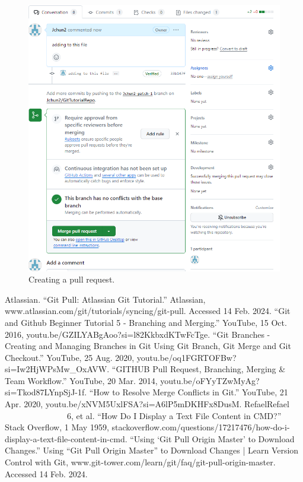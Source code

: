 \documentclass[10pt,twocolumn]{article}
\begin{document}
\begin{figure}
    \centering
    \includegraphics[width=.95\linewidth]{pullrequest.png}
    \caption{
        Creating a pull request.  
    }
    \label{Figure 11}
\end{figure}
\newpage
\newpage
\begin{thebibliography}{100}
\addtolength{\leftmargin}{0.2in} %
\setlength{\itemindent}{-0.2in}

{Atlassian. “Git Pull: Atlassian Git Tutorial.” Atlassian, www.atlassian.com/git/tutorials/syncing/git-pull. Accessed 14 Feb. 2024. }
“Git and Github Beginner Tutorial 5 - Branching and Merging.” YouTube, 15 Oct. 2016, youtu.be/GZILYABgAoo?si=l82KkbxdKTwFcTge. 
“Git Branches - Creating and Managing Branches in Git Using Git Branch, Git Merge and Git Checkout.” YouTube, 25 Aug. 2020, youtu.be/oq1FGRTOFBw?si=Iw2HjWPsMw_OxAVW. 
“GITHUB Pull Request, Branching, Merging & Team Workflow.” YouTube, 20 Mar. 2014, youtu.be/oFYyTZwMyAg?si=Tkod87LYnpSjJ-1f. 
“How to Resolve Merge Conflicts in Git.” YouTube, 21 Apr. 2020, youtu.be/xNVM5UxlFSA?si=A6lP5mDKHFx8DusM. 
RefaelRefael                      6, et al. “How Do I Display a Text File Content in CMD?” Stack Overflow, 1 May 1959, stackoverflow.com/questions/17217476/how-do-i-display-a-text-file-content-in-cmd. 
“Using ‘Git Pull Origin Master’ to Download Changes.” Using “Git Pull Origin Master” to Download Changes | Learn Version Control with Git, www.git-tower.com/learn/git/faq/git-pull-origin-master. Accessed 14 Feb. 2024. 
\end{thebibliography}


\printbibliography
\printbibliography
\end{document}
